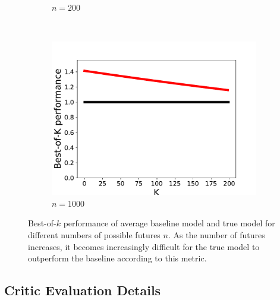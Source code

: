 \documentclass{article}
\begin{document}
\begin{figure}
\begin{subfigure}[b]{0.3\textwidth}
    \caption{$n=200$}
    \label{fig:tiger}
  \end{subfigure}
  ~ %
  \begin{subfigure}[b]{0.3\textwidth}
    \includegraphics[width=\textwidth]{images/best_of_k_toy_n1000.pdf}
    \caption{$n=1000$}
    \label{fig:mouse}
  \end{subfigure}
  \caption{Best-of-$k$ performance of average baseline model and true model for different numbers of possible futures $n$. As the number of futures increases, it becomes increasingly difficult for the true model to outperform the baseline according to this metric.}\label{expected-loss}
  \end{figure}




\subsection{Critic Evaluation Details}
\end{document}
